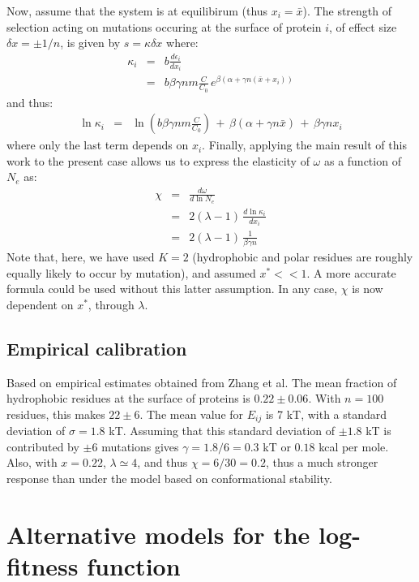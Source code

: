 \documentclass{article}
\begin{document}
Now, assume that the system is at equilibirum (thus $x_i = \bar x$). The strength of selection acting on mutations occuring at the surface of protein $i$, of effect size $\delta x = \pm 1/n$, is given by $s = \kappa \delta x$ where:
\begin{eqnarray}
\kappa_i &=& b \frac{d \epsilon_i} {d x_i} 
\\ &=&
b \beta \gamma n m \frac{C}{C_0} \, e^{\beta (\alpha +\gamma n (\bar x + x_i))}
\end{eqnarray}
and thus:
\begin{eqnarray}
\ln \kappa_i &=& \ln \left( b \beta \gamma n m \frac{C}{C_0}  \right) \, + \, \beta (\alpha +\gamma n \bar x) \, + \, \beta \gamma n x_i
\end{eqnarray}
where only the last term depends on $x_i$.
Finally, applying the main result of this work to the present case allows us to express the elasticity of $\omega$ as a function of $N_e$ as:
\begin{eqnarray}
\chi &=& \frac{d \omega} {d \ln N_e} 
\\ &=&  2(\lambda - 1) \, \frac{d \ln \kappa_i}{d x_i} 
\\ &=&  2 (\lambda - 1) \, \frac{1}{\beta \gamma n}
\end{eqnarray}
Note that, here, we have used $K=2$ (hydrophobic and polar residues are roughly equally likely to occur by mutation), and assumed $x^* << 1$. A more accurate formula could be used without this latter assumption. In any case, $\chi$ is now dependent on $x^*$, through $\lambda$.

\subsection*{Empirical calibration}

Based on empirical estimates obtained from Zhang et al. The mean fraction of hydrophobic residues at the surface of proteins is $0.22 \pm 0.06$. With $n=100$ residues, this makes $22 \pm 6$. The mean value for $E_{ij}$ is 7 kT, with a standard deviation of $\sigma = 1.8$ kT. Assuming that this standard deviation of $\pm 1.8$ kT is contributed by $\pm 6$ mutations gives $\gamma = 1.8 / 6 = 0.3$ kT or $0.18$ kcal per mole. Also, with $x=0.22$, $\lambda \simeq 4$, and thus $\chi = 6  / 30 = 0.2$, thus a much stronger response than under the model based on conformational stability.


\section*{Alternative models for the log-fitness function}
\end{document}
